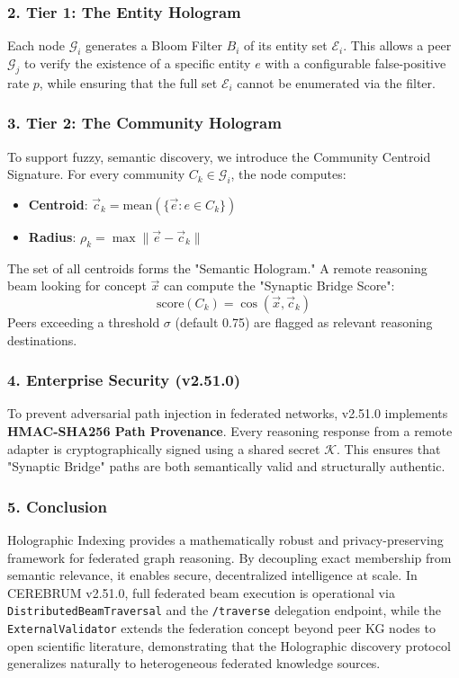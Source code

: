 \subsubsection{2. Tier 1: The Entity Hologram}
Each node $\mathcal{G}_i$ generates a Bloom Filter $B_i$ of its entity set $\mathcal{E}_i$. This allows a peer $\mathcal{G}_j$ to verify the existence of a specific entity $e$ with a confi\-gurable false-positive rate $p$, while ensuring that the full set $\mathcal{E}_i$ cannot be enumerated via the filter.

\subsubsection{3. Tier 2: The Community Hologram}
To support fuzzy, semantic discovery, we introduce the Community Centroid Signature. For every community $C_k \in \mathcal{G}_i$, the node computes:
\begin{itemize}
\item \textbf{Centroid}: $\vec{c}_k = \text{mean}(\{\vec{e} : e \in C_k\})$
\item \textbf{Radius}: $\rho_k = \max \|\vec{e} - \vec{c}_k\|$

\end{itemize}
The set of all centroids forms the "Semantic Hologram." A remote reasoning beam looking for concept $\vec{x}$ can compute the "Synaptic Bridge Score":
\begin{equation}
\text{score}(C_k) = \cos(\vec{x}, \vec{c}_k)
\end{equation}
Peers exceeding a threshold $\sigma$ (default 0.75) are flagged as relevant reasoning desti\-nations.

\subsubsection{4. Enterprise Security (v2.51.0)}
To prevent adversarial path injection in federated networks, v2.51.0 implements \textbf{HMAC-SHA256 Path Provenance}. Every reasoning response from a remote adapter is crypt\-ographically signed using a shared secret $\mathcal{K}$. This ensures that "Synaptic Bridge" paths are both seman\-tically valid and struc\-turally authentic.

\subsubsection{5. Conclusion}
Holographic Indexing provides a mathe\-matically robust and privacy-preserving framework for federated graph reasoning. By decoupling exact membership from semantic relevance, it enables secure, decen\-tralized intel\-ligence at scale. In CEREBRUM v2.51.0, full federated beam execution is operational via \texttt{DistributedBeamTraversal} and the \texttt{/traverse} delegation endpoint, while the \texttt{ExternalValidator} extends the federation concept beyond peer KG nodes to open scientific literature, demon\-strating that the Holographic discovery protocol generalizes naturally to heter\-ogeneous federated knowledge sources.

